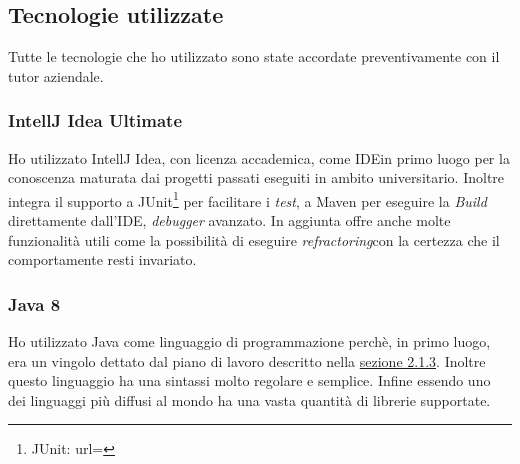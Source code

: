 \subsection{Tecnologie utilizzate}
Tutte le tecnologie che ho utilizzato sono state accordate preventivamente con il tutor aziendale.
\subsubsection{IntellJ Idea Ultimate}
Ho utilizzato IntellJ Idea, con licenza accademica, come IDE\glsfirstoccur in primo luogo per la conoscenza maturata dai progetti passati eseguiti in ambito universitario. Inoltre integra il supporto a JUnit\footnote{JUnit: url= } per facilitare i \textit{test}, a Maven per eseguire la \textit{Build} direttamente dall'IDE, \textit{debugger} avanzato. In aggiunta offre anche molte funzionalità utili come la possibilità di eseguire \textit{refractoring}\glsfirstoccur con la certezza che il comportamente resti invariato.

\subsubsection{Java 8}
Ho utilizzato Java come linguaggio di programmazione perchè, in primo luogo, era un vingolo dettato dal piano di lavoro descritto nella \hyperlink{sec:pianodl}{sezione 2.1.3}. Inoltre questo linguaggio ha una sintassi molto regolare e semplice. Infine essendo uno dei linguaggi più diffusi al mondo ha una vasta quantità di librerie supportate.
